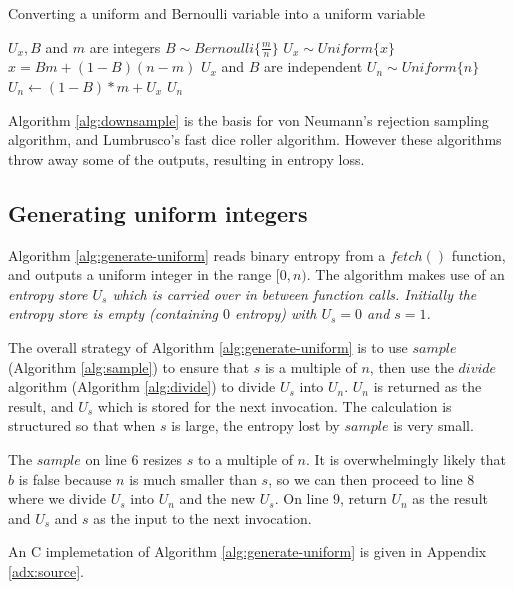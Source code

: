 \documentclass[12pt]{article}
\begin{document}

\begin{algorithm}
\caption{Converting a uniform and Bernoulli variable into a uniform variable}
\label{alg:expand}
\begin{algorithmic}[1]
    \Require $U_{x}, B$ and $m$ are integers 
    \Require $B \sim Bernoulli\{\frac{m}{n}\}$
    \Require $U_{x} \sim Uniform\{x\}$
    \Require $x = Bm + (1-B)(n-m)$
    \Require $U_x$ and $B$ are independent
    \Ensure $U_{n} \sim Uniform\{n\}$
    \State $U_n \gets (1-B)*m + U_x$
    \State \Return $U_n$
\EndProcedure
\end{algorithmic}
\end{algorithm}


Algorithm \ref{alg:downsample} is the basis for von Neumann's rejection sampling algorithm, and Lumbrusco's fast dice roller algorithm. However these algorithms throw away some of the outputs, resulting in entropy loss.

\subsection{Generating uniform integers}

Algorithm \ref{alg:generate-uniform} reads binary entropy from a $fetch()$ function, and outputs a uniform integer in the range $[0,n)$. The algorithm makes use of an \em entropy store \em $U_s$ which is carried over in between function calls. Initially the entropy store is empty (containing $0$ entropy) with $U_s = 0$ and $s=1$.

The overall strategy of Algorithm \ref{alg:generate-uniform} is to use $sample$ (Algorithm \ref{alg:sample}) to ensure that $s$ is a multiple of $n$, then use the $divide$ algorithm (Algorithm \ref{alg:divide}) to divide $U_s$ into $U_n$. $U_n$ is returned as the result, and $U_s$ which is stored for the next invocation. The calculation is structured so that when $s$ is large, the entropy lost by $sample$ is very small.

The $sample$ on line 6 resizes $s$ to a multiple of $n$. It is overwhelmingly likely that $b$ is false because $n$ is much smaller than $s$, so we can then proceed to line 8 where we divide $U_s$ into $U_n$ and the new $U_s$. On line 9, return $U_n$ as the result and $U_s$ and $s$ as the input to the next invocation.

An C implemetation of Algorithm \ref{alg:generate-uniform} is given in Appendix \ref{adx:source}.
\end{document}
